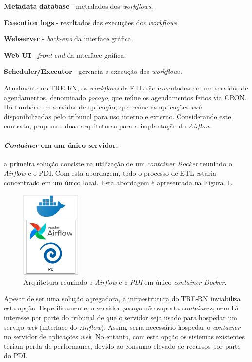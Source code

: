 \textbf{Metadata database} - metadados dos \textit{workflows}.

\textbf{Execution logs} - resultados das execuções dos \textit{workflows}.

\textbf{Webserver} - \textit{back-end} da interface gráfica.

\textbf{Web UI} - \textit{front-end} da interface gráfica.

\textbf{Scheduler/Executor} - gerencia a execução dos \textit{workflows}.

Atualmente no TRE-RN, os \textit{workflows} de ETL são executados em um servidor de agendamentos, denominado \textit{pocoyo}, que reúne os agendamentos feitos via CRON. Há também um servidor de aplicação, que reúne as aplicações \textit{web} disponibilizadas pelo tribunal para uso interno e externo. Considerando este contexto, propomos duas arquiteturas para a implantação do \textit{Airflow}:

\paragraph{\textit{Container} em um único servidor:}
a primeira solução consiste na utilização de um \textit{container Docker} reunindo o \textit{Airflow} e o PDI. Com esta abordagem, todo o processo de ETL estaria concentrado em um único local. Esta abordagem é apresentada na Figura~\ref{fig:docker}.

\begin{figure}[htp]
    \centering
    \includegraphics[width=3cm]{Imagens/Arq_1}
    \caption{Arquitetura reunindo o \textit{Airflow} e o \textit{PDI} em único \textit{container Docker}.}
    \label{fig:docker}
\end{figure}

Apesar de ser uma solução agregadora, a infraestrutura do TRE-RN inviabiliza esta opção. Especificamente, o servidor \textit{pocoyo} não suporta \textit{containers}, nem há interesse por parte do tribunal de que o servidor seja usado para hospedar um serviço \textit{web} (interface do \textit{Airflow}). Assim, seria necessário hospedar o \textit{container} no servidor de aplicações \textit{web}. No entanto, com esta opção os sistemas existentes teriam perda de performance, devido ao consumo elevado de recursos por parte do PDI. 

